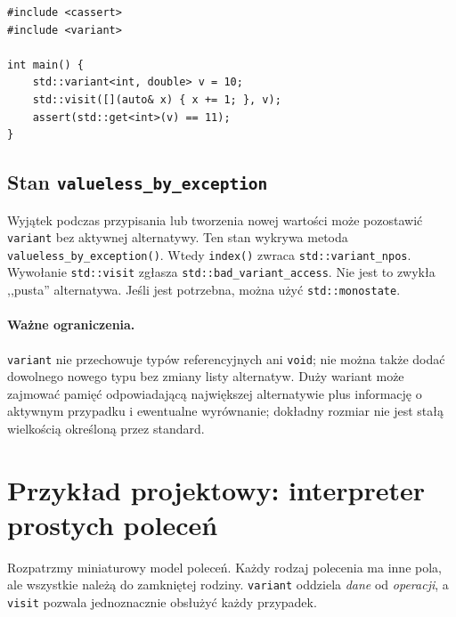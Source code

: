 \begin{lstlisting}[caption={Modyfikacja aktywnej alternatywy; kompletny program.}]
#include <cassert>
#include <variant>

int main() {
    std::variant<int, double> v = 10;
    std::visit([](auto& x) { x += 1; }, v);
    assert(std::get<int>(v) == 11);
}
\end{lstlisting}

\subsection{Stan \texttt{valueless\_by\_exception}}

Wyjątek podczas przypisania lub tworzenia nowej wartości może
pozostawić \texttt{variant} bez aktywnej alternatywy. Ten stan
wykrywa metoda \texttt{valueless\_by\_exception()}.
Wtedy \texttt{index()} zwraca \texttt{std::variant\_npos}.
Wywołanie \texttt{std::visit} zgłasza \texttt{std::bad\_variant\_access}.
Nie jest to zwykła ,,pusta'' alternatywa. Jeśli jest potrzebna,
można użyć \texttt{std::monostate}.

\paragraph{Ważne ograniczenia.}
\texttt{variant} nie przechowuje typów referencyjnych ani \texttt{void};
nie można także dodać dowolnego nowego typu bez zmiany listy alternatyw.
Duży wariant może zajmować pamięć odpowiadającą największej alternatywie
plus informację o aktywnym przypadku i ewentualne wyrównanie; dokładny
rozmiar nie jest stałą wielkością określoną przez standard.

\section{Przykład projektowy: interpreter prostych poleceń}
\label{sec:cpp14-commands}

Rozpatrzmy miniaturowy model poleceń. Każdy rodzaj polecenia ma inne pola,
ale wszystkie należą do zamkniętej rodziny. \texttt{variant} oddziela
\emph{dane} od \emph{operacji}, a \texttt{visit} pozwala jednoznacznie
obsłużyć każdy przypadek.

